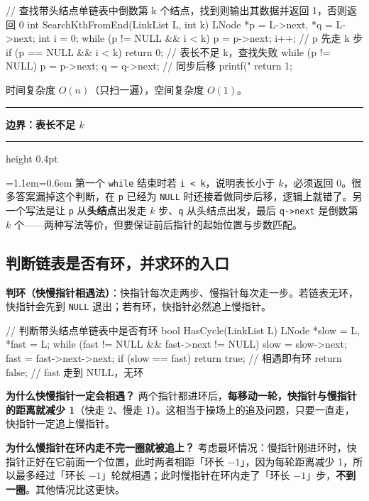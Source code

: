 \documentclass[11pt,openany,UTF8]{ctexbook}
\newcommand{\callouthead}[2]{%
  \par\addvspace{7pt}\noindent
  {\color{#1}\rule[-0.15em]{3pt}{1.05em}}\hspace{0.5em}%
  {\bfseries\color{#1}#2}\par\nobreak\vspace{-0.35em}%
  {\color{rulesep}\hrule height 0.4pt}\nobreak\vspace{0.45em}%
  \begingroup\small\setlength{\parindent}{0pt}%
  \leftskip=1.1em\rightskip=0.6em\noindent\ignorespaces}
\newcommand{\calloutend}{\par\endgroup\addvspace{7pt}}
\newenvironment{callwarn}[1]{\callouthead{warnbar}{#1}}{\calloutend}
\begin{document}
\begin{codebox}
// 查找带头结点单链表中倒数第 k 个结点，找到则输出其数据并返回 1，否则返回 0
int SearchKthFromEnd(LinkList L, int k) {
    LNode *p = L->next, *q = L->next;
    int i = 0;
    while (p != NULL && i < k) { p = p->next; i++; }  // p 先走 k 步
    if (p == NULL && i < k) return 0;                 // 表长不足 k，查找失败
    while (p != NULL) { p = p->next; q = q->next; }   // 同步后移
    printf("%
    return 1;
}
\end{codebox}

时间复杂度 $O(n)$（只扫一遍），空间复杂度 $O(1)$。

\begin{callwarn}{边界：表长不足 $k$}
第一个 \texttt{while} 结束时若 \texttt{i <\allowbreak{} k}，说明表长小于 $k$，必须返回 0。很多答案漏掉这个判断，在 \texttt{p} 已经为 \texttt{NULL} 时还接着做同步后移，逻辑上就错了。另一个写法是让 \texttt{p} 从\textbf{头结点}出发走 $k$ 步、\texttt{q} 从头结点出发，最后 \texttt{q->\allowbreak{}next} 是倒数第 $k$ 个——两种写法等价，但要保证前后指针的起始位置与步数匹配。

\end{callwarn}

\subsection{判断链表是否有环，并求环的入口}

\textbf{判环（快慢指针相遇法）}：快指针每次走两步、慢指针每次走一步。若链表无环，快指针会先到 \texttt{NULL} 退出；若有环，快指针必然追上慢指针。

\begin{codebox}
// 判断带头结点单链表中是否有环
bool HasCycle(LinkList L) {
    LNode *slow = L, *fast = L;
    while (fast != NULL && fast->next != NULL) {
        slow = slow->next;
        fast = fast->next->next;
        if (slow == fast) return true;   // 相遇即有环
    }
    return false;                        // fast 走到 NULL，无环
}
\end{codebox}

\textbf{为什么快慢指针一定会相遇？} 两个指针都进环后，\textbf{每移动一轮，快指针与慢指针的距离就减少 1}（快走 2、慢走 1）。这相当于操场上的追及问题，只要一直走，快指针一定追上慢指针。

\textbf{为什么慢指针在环内走不完一圈就被追上？} 考虑最坏情况：慢指针刚进环时，快指针正好在它前面一个位置，此时两者相距「环长 $-1$」，因为每轮距离减少 1，所以最多经过「环长 $-1$」轮就相遇；此时慢指针在环内走了「环长 $-1$」步，\textbf{不到一圈}。其他情况比这更快。
\end{document}

